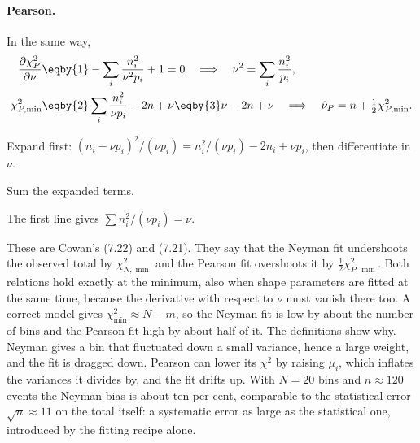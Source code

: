 \paragraph{Pearson.} In the same way,
\begin{align*}
  \frac{\partial\chi^2_P}{\partial\nu}
  &\eqby{1}-\sum_i\frac{n_i^2}{\nu^2p_i}+1=0
  \quad\Longrightarrow\quad
  \nu^2=\sum_i\frac{n_i^2}{p_i},\\
  \chi^2_{P,\min}
  &\eqby{2}\sum_i\frac{n_i^2}{\nu p_i}-2n+\nu
  \eqby{3}\nu-2n+\nu
  \quad\Longrightarrow\quad
  \hat\nu_P=n+\tfrac12\chi^2_{P,\min} .
\end{align*}
\begin{explain}
  \item Expand first: $(n_i-\nu p_i)^2/(\nu p_i)=n_i^2/(\nu p_i)-2n_i+\nu p_i$,
        then differentiate in $\nu$.
  \item Sum the expanded terms.
  \item The first line gives $\sum n_i^2/(\nu p_i)=\nu$.
\end{explain}
These are Cowan's (7.22) and (7.21). They say that the Neyman fit
undershoots the observed total by $\chi^2_{N,\min}$ and the Pearson fit
overshoots it by $\tfrac12\chi^2_{P,\min}$. Both relations hold exactly at the
minimum, also when shape parameters are fitted at the same time, because
the derivative with respect to $\nu$ must vanish there too. A correct model
gives $\chi^2_{\min}\approx N-m$, so the Neyman fit is low by about the
number of bins and the Pearson fit high by about half of it. The definitions
show why. Neyman gives a bin that fluctuated down a small variance, hence a
large weight, and the fit is dragged down. Pearson can lower its $\chi^2$ by
raising $\mu_i$, which inflates the variances it divides by, and the fit
drifts up. With $N=20$
bins and $n\approx120$ events the Neyman bias is about ten per cent,
comparable to the statistical error $\sqrt n\approx11$ on the total itself:
a systematic error as large as the statistical one, introduced by the
fitting recipe alone.

